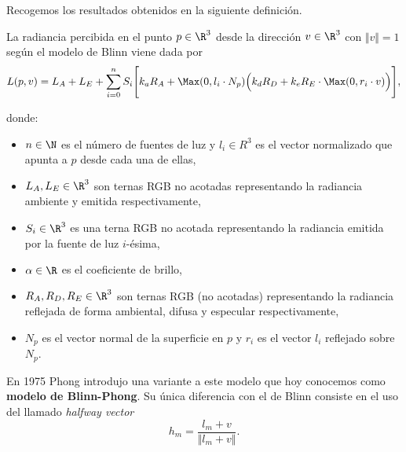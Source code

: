 Recogemos los resultados obtenidos en la siguiente definición.
\begin{definicion}\label{def:blinn} La radiancia percibida en el punto $p\in\R^3$ desde la dirección $v\in\R^3$ con $\Vert v\Vert = 1$ según el modelo de Blinn viene dada por
    \begin{equation*}
        L(p,v) = L_A+L_E+ \sum_{i=0}^n S_i \Bigg[ k_aR_A + \Max(0,l_i\cdot N_p) \Big( k_dR_D + k_eR_E\cdot \Max(0,r_i\cdot v) \Big) \Bigg],
    \end{equation*}

    donde:
    \begin{itemize}
        \item $n \in \N$ es el número de fuentes de luz y $l_i \in R^3$ es el vector normalizado que apunta a $p$ desde cada una de ellas,
        \item $L_A,L_E \in \R^3$ son ternas RGB no acotadas representando la radiancia ambiente y emitida respectivamente,
        \item $S_i \in \R^3$ es una terna RGB no acotada representando la radiancia emitida por la fuente de luz $i$-ésima,
        \item $\alpha \in \R$ es el coeficiente de brillo,
        \item $R_A,R_D,R_E \in \R^3$ son ternas RGB (no acotadas) representando la radiancia reflejada de forma ambiental, difusa y especular respectivamente,
        \item $N_p$ es el vector normal de la superficie en $p$ y $r_i$ es el vector $l_i$ reflejado sobre $N_p$.
    \end{itemize}
\end{definicion}

En 1975 Phong \cite{phong} introdujo una variante a este modelo que hoy conocemos como \textbf{modelo de Blinn-Phong}. Su única diferencia con el de Blinn consiste en el uso del llamado \textit{halfway vector}
\begin{equation*}
    h_m = \frac{l_m + v}{\Vert l_m + v\Vert}.
\end{equation*}

